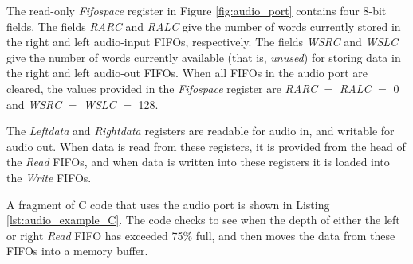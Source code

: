 The read-only {\it Fifospace} register in Figure \ref{fig:audio_port} contains four 8-bit fields.
The fields {\it RARC} and {\it RALC} give the number of words currently stored in the 
right and left audio-input FIFOs, respectively. The fields {\it WSRC} and {\it WSLC} give 
the number of words currently available (that is, {\it unused}) for storing data in the right 
and left audio-out FIFOs. When all FIFOs in the audio port are cleared, the values provided 
in the {\it Fifospace} register are {\it RARC} $=$ {\it RALC} $=$ 0 
and {\it WSRC} $=$ {\it WSLC} $=$ 128.

The {\it Leftdata} and {\it Rightdata} registers are readable for audio in, and writable
for audio out. When data is read from these registers, it is provided from the head of the
{\it Read} FIFOs, and when data is written into these registers it is loaded into the {\it
Write} FIFOs.

A fragment of C code that uses the audio port is shown in Listing \ref{lst:audio_example_C}.
The code checks to
see when the depth of either the left or right {\it Read} FIFO has exceeded 75\% full, and then
moves the data from these FIFOs into a memory buffer.




